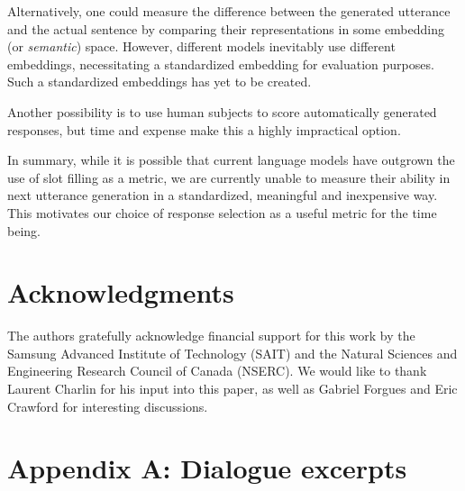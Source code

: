 \documentclass[11pt,a4paper]{article}
\begin{document}
Alternatively, one could measure the difference between the generated utterance and the actual sentence by comparing their representations in some embedding (or \emph{semantic}) space.  However, different models inevitably use different embeddings, necessitating a standardized embedding for evaluation purposes. Such a standardized embeddings has yet to be created. 

Another possibility is to use human subjects to score automatically generated responses, but time and expense make this a highly impractical option.

In summary, while it is possible that current language models have outgrown the use of slot filling as a metric, we are currently unable to measure their ability in next utterance generation in a standardized, meaningful and inexpensive way.  This motivates our choice of response selection as a useful metric for the time being.

\section*{Acknowledgments}

The authors gratefully acknowledge financial support for this work by the Samsung Advanced Institute of Technology (SAIT) and the Natural Sciences and Engineering Research Council of Canada (NSERC).  We would like to thank Laurent Charlin for his input into this paper, as well as Gabriel Forgues and Eric Crawford for interesting discussions. 







\nocite{zeiler2012adadelta}
\nocite{wang2013dataset}

\section*{Appendix A: Dialogue excerpts}
\end{document}
